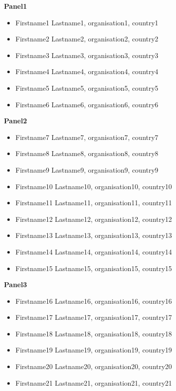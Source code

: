\begin{multicols}{2}
{\bfseries Panel1}
\begin{itemize}
  \item Firstname1 Lastname1, organisation1, country1
  \item Firstname2 Lastname2, organisation2, country2
  \item Firstname3 Lastname3, organisation3, country3
  \item Firstname4 Lastname4, organisation4, country4
  \item Firstname5 Lastname5, organisation5, country5
  \item Firstname6 Lastname6, organisation6, country6
\end{itemize}

\vspace{1.5mm}

{\bfseries Panel2}
\begin{itemize}
  \item Firstname7 Lastname7, organisation7, country7
  \item Firstname8 Lastname8, organisation8, country8
  \item Firstname9 Lastname9, organisation9, country9
  \item Firstname10 Lastname10, organisation10, country10
  \item Firstname11 Lastname11, organisation11, country11
  \item Firstname12 Lastname12, organisation12, country12
  \item Firstname13 Lastname13, organisation13, country13
  \item Firstname14 Lastname14, organisation14, country14
  \item Firstname15 Lastname15, organisation15, country15
\end{itemize}

\vspace{1.5mm}

{\bfseries Panel3}
\begin{itemize}
  \item Firstname16 Lastname16, organisation16, country16
  \item Firstname17 Lastname17, organisation17, country17
  \item Firstname18 Lastname18, organisation18, country18
  \item Firstname19 Lastname19, organisation19, country19
  \item Firstname20 Lastname20, organisation20, country20
  \item Firstname21 Lastname21, organisation21, country21
\end{itemize}

\vfill

\end{multicols}

\newpage
